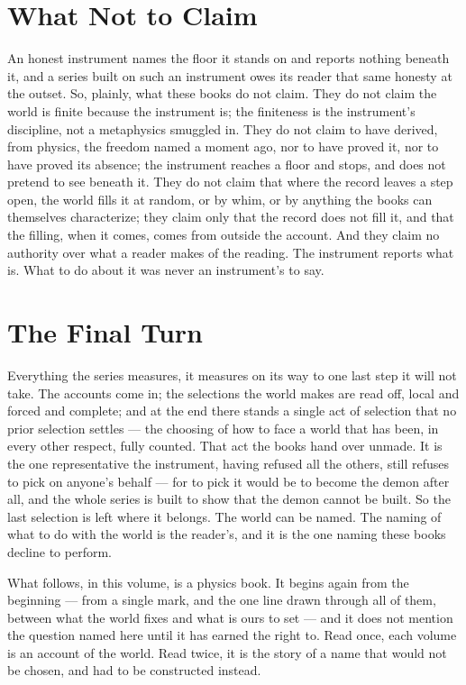 \section*{What Not to Claim}

An honest instrument names the floor it stands on and reports nothing beneath it, and a series built on such an
instrument owes its reader that same honesty at the outset. So, plainly, what these books do not claim. They do
not claim the world is finite because the instrument is; the finiteness is the instrument's discipline, not a
metaphysics smuggled in. They do not claim to have derived, from physics, the freedom named a moment ago, nor to
have proved it, nor to have proved its absence; the instrument reaches a floor and stops, and does not pretend to
see beneath it. They do not claim that where the record leaves a step open, the world fills it at random, or by
whim, or by anything the books can themselves characterize; they claim only that the record does not fill it, and
that the filling, when it comes, comes from outside the account. And they claim no authority over what a reader
makes of the reading. The instrument reports what is. What to do about it was never an instrument's to say.

\section*{The Final Turn}

Everything the series measures, it measures on its way to one last step it will not take. The accounts come in;
the selections the world makes are read off, local and forced and complete; and at the end there stands a single
act of selection that no prior selection settles --- the choosing of how to face a world that has been, in every
other respect, fully counted. That act the books hand over unmade. It is the one representative the instrument,
having refused all the others, still refuses to pick on anyone's behalf --- for to pick it would be to become the
demon after all, and the whole series is built to show that the demon cannot be built. So the last selection is
left where it belongs. The world can be named. The naming of what to do with the world is the reader's, and it is
the one naming these books decline to perform.

\bigskip

\noindent What follows, in this volume, is a physics book. It begins again from the beginning --- from a single
mark, and the one line drawn through all of them, between what the world fixes and what is ours to set --- and it
does not mention the question named here until it has earned the right to. Read once, each volume is an account
of the world. Read twice, it is the story of a name that would not be chosen, and had to be constructed instead.
